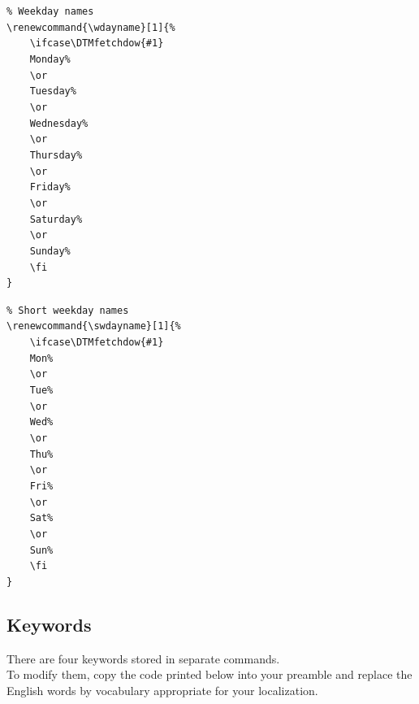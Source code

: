 \documentclass[11pt]{ltxdoc}
\begin{document}
	\medskip
	\verb|% Weekday names| \\
	\verb|\renewcommand{\wdayname}[1]{%| \\
	\verb|    \ifcase\DTMfetchdow{#1}| \\
	\verb|    Monday%| \\
	\verb|    \or| \\
	\verb|    Tuesday%| \\
	\verb|    \or| \\
	\verb|    Wednesday%| \\
	\verb|    \or| \\
	\verb|    Thursday%| \\
	\verb|    \or| \\
	\verb|    Friday%| \\
	\verb|    \or| \\
	\verb|    Saturday%| \\
	\verb|    \or| \\
	\verb|    Sunday%| \\
	\verb|    \fi| \\
	\verb|}|
	
	\bigskip
	\verb|% Short weekday names| \\
	\verb|\renewcommand{\swdayname}[1]{%| \\
	\verb|    \ifcase\DTMfetchdow{#1}| \\
	\verb|    Mon%| \\
	\verb|    \or| \\
	\verb|    Tue%| \\
	\verb|    \or| \\
	\verb|    Wed%| \\
	\verb|    \or| \\
	\verb|    Thu%| \\
	\verb|    \or| \\
	\verb|    Fri%| \\
	\verb|    \or| \\
	\verb|    Sat%| \\
	\verb|    \or| \\
	\verb|    Sun%| \\
	\verb|    \fi| \\
	\verb|}|
	
	
	\subsection{Keywords}
	There are four keywords stored in separate commands. \\
	To modify them, copy the code printed below into your preamble and replace the English words by vocabulary appropriate for your localization.
	
\end{document}
